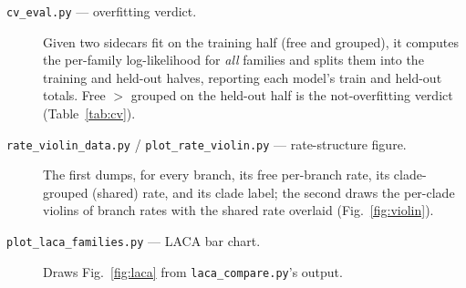 \documentclass[11pt]{article}
\newcommand{\code}[1]{\texttt{\small #1}}
\begin{document}
\begin{description}
\item[\code{cv\_eval.py} --- overfitting verdict.] Given two sidecars fit on the training
  half (free and grouped), it computes the per-family log-likelihood for \emph{all} families
  and splits them into the training and held-out halves, reporting each model's train and
  held-out totals. Free $>$ grouped on the held-out half is the not-overfitting verdict
  (Table~\ref{tab:cv}).

\item[\code{rate\_violin\_data.py} / \code{plot\_rate\_violin.py} --- rate-structure figure.]
  The first dumps, for every branch, its free per-branch rate, its clade-grouped (shared)
  rate, and its clade label; the second draws the per-clade violins of branch rates with the
  shared rate overlaid (Fig.~\ref{fig:violin}).

\item[\code{plot\_laca\_families.py} --- LACA bar chart.] Draws Fig.~\ref{fig:laca} from
  \code{laca\_compare.py}'s output.
\end{description}

\FloatBarrier
\end{document}
